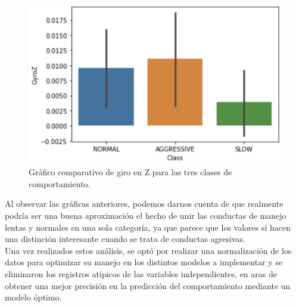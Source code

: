 \documentclass[spanish,12pt,letterpaper]{article}
\begin{document}
    \begin{figure}[H]
        \centering
        \includegraphics[width=1\columnwidth]{GyroZ.png}
        \caption{Gráfico comparativo de giro en Z para las tres clases de comportamiento.}
        \label{fig:comand}%
    \end{figure}

\textsc Al observar las gráficas anteriores, podemos darnos cuenta de que realmente podría ser una buena aproximación el hecho de unir las conductas de manejo lentas y normales en una sola categoría, ya que parece que los valores sí hacen una distinción interesante cuando se trata de conductas agresivas. \\

\textsc Una vez realizados estos análisis, se optó por realizar una normalización de los datos para optimizar su manejo en los distintos modelos a implementar y se eliminaron los registros atípicos de las variables independientes, en aras de obtener una mejor precisión en la predicción del comportamiento mediante un modelo óptimo.

\newpage
\end{document}
